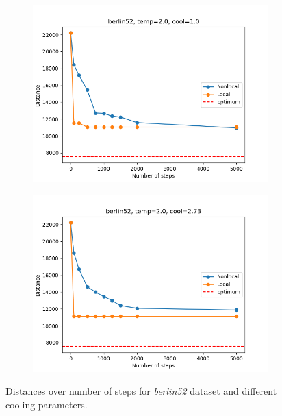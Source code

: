 \begin{figure}[!htb]
	\centering
	\begin{subfigure}{0.45\textwidth}
		\includegraphics[width=\textwidth]{img/berlin52_temp=2.0_cool=1.0}
	\end{subfigure}
	\begin{subfigure}{0.45\textwidth}
		\includegraphics[width=\textwidth]{img/berlin52_temp=2.0_cool=2.73}
	\end{subfigure}
	\caption{Distances over number of steps for \textit{berlin52} dataset and different cooling parameters.}
	\label{fig:berlin52_comp}
\end{figure}
	
